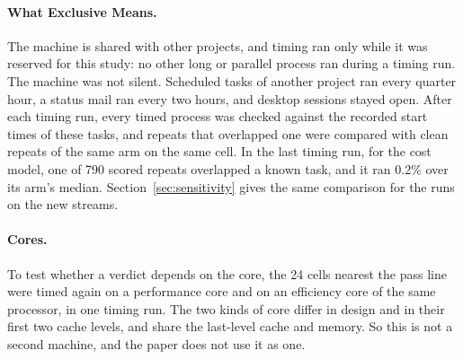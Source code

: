 \paragraph{What Exclusive Means.}
The machine is shared with other projects, and timing ran only while it was reserved for this study: no other long or parallel process ran during a timing run.
The machine was not silent.
Scheduled tasks of another project ran every quarter hour, a status mail ran every two hours, and desktop sessions stayed open.
After each timing run, every timed process was checked against the recorded start times of these tasks, and repeats that overlapped one were compared with clean repeats of the same arm on the same cell.
In the last timing run, for the cost model, one of 790 scored repeats overlapped a known task, and it ran 0.2\% over its arm's median.
Section~\ref{sec:sensitivity} gives the same comparison for the runs on the new streams.

\paragraph{Cores.}
To test whether a verdict depends on the core, the 24 cells nearest the pass line were timed again on a performance core and on an efficiency core of the same processor, in one timing run.
The two kinds of core differ in design and in their first two cache levels, and share the last-level cache and memory.
So this is not a second machine, and the paper does not use it as one.
